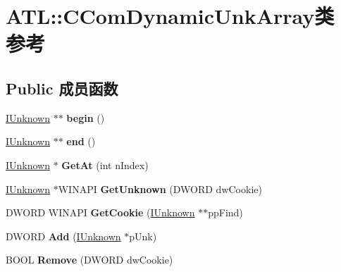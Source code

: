 \hypertarget{class_a_t_l_1_1_c_com_dynamic_unk_array}{}\section{A\+TL\+:\+:C\+Com\+Dynamic\+Unk\+Array类 参考}
\label{class_a_t_l_1_1_c_com_dynamic_unk_array}
\subsection*{Public 成员函数}
\begin{DoxyCompactItemize}
\item 
\mbox{\label{class_a_t_l_1_1_c_com_dynamic_unk_array_a9e22024f33940d55e36c5d9b2717fd0e}} 
\hyperlink{interface_i_unknown}{I\+Unknown} $\ast$$\ast$ {\bfseries begin} ()
\item 
\mbox{\label{class_a_t_l_1_1_c_com_dynamic_unk_array_ae474b61804b86cc6d7c664869c6926a5}} 
\hyperlink{interface_i_unknown}{I\+Unknown} $\ast$$\ast$ {\bfseries end} ()
\item 
\mbox{\label{class_a_t_l_1_1_c_com_dynamic_unk_array_aee9e2dacc5b24ac834f9d2a1e019f5d2}} 
\hyperlink{interface_i_unknown}{I\+Unknown} $\ast$ {\bfseries Get\+At} (int n\+Index)
\item 
\mbox{\label{class_a_t_l_1_1_c_com_dynamic_unk_array_a76da174cfc265eb6694616543a6f55ad}} 
\hyperlink{interface_i_unknown}{I\+Unknown} $\ast$W\+I\+N\+A\+PI {\bfseries Get\+Unknown} (D\+W\+O\+RD dw\+Cookie)
\item 
\mbox{\label{class_a_t_l_1_1_c_com_dynamic_unk_array_a67da911fc533c647a6abf99170846903}} 
D\+W\+O\+RD W\+I\+N\+A\+PI {\bfseries Get\+Cookie} (\hyperlink{interface_i_unknown}{I\+Unknown} $\ast$$\ast$pp\+Find)
\item 
\mbox{\label{class_a_t_l_1_1_c_com_dynamic_unk_array_a6f18950f3b1deec8e7d5439675cb5d1b}} 
D\+W\+O\+RD {\bfseries Add} (\hyperlink{interface_i_unknown}{I\+Unknown} $\ast$p\+Unk)
\item 
\mbox{\label{class_a_t_l_1_1_c_com_dynamic_unk_array_a017c15c64cf2c1979616bfc66d396e7b}} 
B\+O\+OL {\bfseries Remove} (D\+W\+O\+RD dw\+Cookie)
\end{DoxyCompactItemize}
